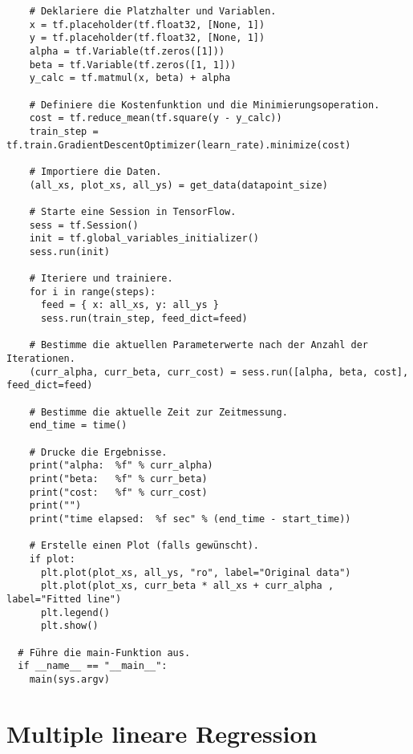 \begin{verbatim}
    # Deklariere die Platzhalter und Variablen.
    x = tf.placeholder(tf.float32, [None, 1])
    y = tf.placeholder(tf.float32, [None, 1])
    alpha = tf.Variable(tf.zeros([1]))
    beta = tf.Variable(tf.zeros([1, 1]))
    y_calc = tf.matmul(x, beta) + alpha

    # Definiere die Kostenfunktion und die Minimierungsoperation.
    cost = tf.reduce_mean(tf.square(y - y_calc))
    train_step = tf.train.GradientDescentOptimizer(learn_rate).minimize(cost)

    # Importiere die Daten.
    (all_xs, plot_xs, all_ys) = get_data(datapoint_size)

    # Starte eine Session in TensorFlow.
    sess = tf.Session()
    init = tf.global_variables_initializer()
    sess.run(init)

    # Iteriere und trainiere.
    for i in range(steps):
      feed = { x: all_xs, y: all_ys }
      sess.run(train_step, feed_dict=feed)

    # Bestimme die aktuellen Parameterwerte nach der Anzahl der Iterationen.
    (curr_alpha, curr_beta, curr_cost) = sess.run([alpha, beta, cost], feed_dict=feed)

    # Bestimme die aktuelle Zeit zur Zeitmessung.
    end_time = time()

    # Drucke die Ergebnisse.
    print("alpha:  %f" % curr_alpha)
    print("beta:   %f" % curr_beta)
    print("cost:   %f" % curr_cost)
    print("")
    print("time elapsed:  %f sec" % (end_time - start_time))

    # Erstelle einen Plot (falls gewünscht).
    if plot:
      plt.plot(plot_xs, all_ys, "ro", label="Original data")
      plt.plot(plot_xs, curr_beta * all_xs + curr_alpha , label="Fitted line")
      plt.legend()
      plt.show()

  # Führe die main-Funktion aus.
  if __name__ == "__main__":
    main(sys.argv)
\end{verbatim}

\section{Multiple lineare Regression}
\label{appendix:C:2}


